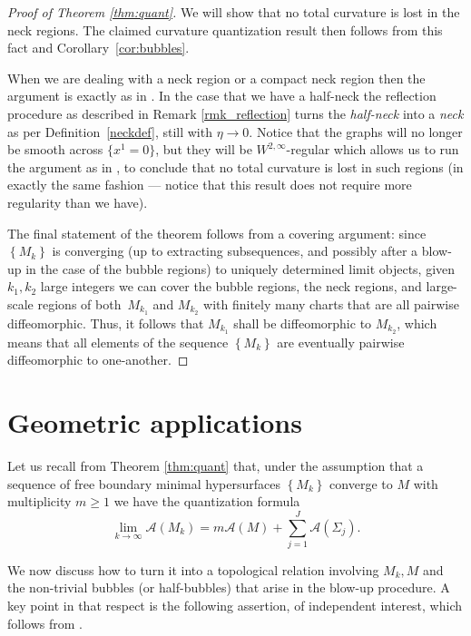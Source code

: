 \documentclass[10pt]{amsart}
\let\mathcal\mathscr
\newcounter{cas}
\theoremstyle{definition}
\begin{document}
\begin{proof}[Proof of Theorem \ref{thm:quant}]
We will show that no total curvature is lost in the neck regions. The claimed curvature quantization result then follows from this fact and Corollary~\ref{cor:bubbles}.

When we are dealing with a neck region or a compact neck region then the argument is exactly as in \cite[p.\,4392--4395]{BS17}. In the case that we have a half-neck the reflection procedure as described in Remark \ref{rmk_reflection} turns the \emph{half-neck} into a \emph{neck} as per Definition~\ref{neckdef}, still with $\eta \to 0$. Notice that the graphs will no longer be smooth across $\{x^1 =0\}$, but they will be $W^{2,\infty}$-regular which allows us to run the argument as in \hbox{\cite[p.\,4392--4395]{BS17}}, to conclude that no total curvature is lost in such regions (in exactly the same fashion --- notice that this result does not require more regularity than we have).

The final statement of the theorem follows from a covering argument: since $\left\{M_k\right\}$ is converging (up to extracting subsequences, and possibly after a blow-up in the case of the bubble regions) to uniquely determined limit objects, given $k_1, k_2$ large integers we can cover the bubble regions, the neck regions, and large-scale regions of both~$M_{k_1}$ and $M_{k_2}$ with finitely many charts that are all pairwise diffeomorphic. Thus, it follows that $M_{k_1}$ shall be diffeomorphic to $M_{k_2}$, which means that all elements of the sequence $\left\{M_k\right\}$ are eventually pairwise diffeomorphic to one-another.
\end{proof}

\section{Geometric applications}\label{sec:appl}

Let us recall from Theorem \ref{thm:quant} that, under the assumption that a sequence of free boundary minimal hypersurfaces $\left\{M_k \right\}$ converge to $M$ with multiplicity $m\geq 1$ we have the quantization formula
\[
\lim_{k\to\infty}\mathcal{A}(M_k) =m\mathcal{A}(M)+ \sum_{j=1}^J\mathcal{A}(\Sigma_j).
\]

We now discuss how to turn it into a topological relation involving $M_k, M$ and the non-trivial bubbles (or half-bubbles) that arise in the blow-up procedure. A key point in that respect is the following assertion, of independent interest, which follows from \cite[Th.\,29]{ACS17}.
\end{document}
